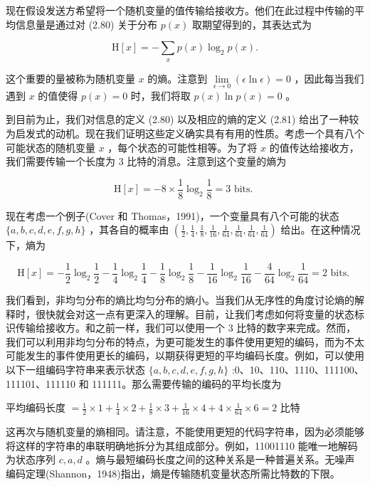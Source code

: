 \documentclass[10pt]{article}
\begin{document}
现在假设发送方希望将一个随机变量的值传输给接收方。他们在此过程中传输的平均信息量是通过对 (2.80) 关于分布 \(p\left( x\right)\) 取期望得到的，其表达式为

\[
\mathrm{H}\left\lbrack  x\right\rbrack   =  - \mathop{\sum }\limits_{x}p\left( x\right) {\log }_{2}p\left( x\right) . \tag{2.81}
\]

这个重要的量被称为随机变量 \(x\) 的熵。注意到 \(\mathop{\lim }\limits_{{\epsilon  \rightarrow  0}}\left( {\epsilon \ln \epsilon }\right)  = 0\) ，因此每当我们遇到 \(x\) 的值使得 \(p\left( x\right)  = 0\) 时，我们将取 \(p\left( x\right) \ln p\left( x\right)  = 0\) 。

到目前为止，我们对信息的定义 (2.80) 以及相应的熵的定义 (2.81) 给出了一种较为启发式的动机。现在我们证明这些定义确实具有有用的性质。考虑一个具有八个可能状态的随机变量 \(x\) ，每个状态的可能性相等。为了将 \(x\) 的值传达给接收方，我们需要传输一个长度为 3 比特的消息。注意到这个变量的熵为

\[
\mathrm{H}\left\lbrack  x\right\rbrack   =  - 8 \times  \frac{1}{8}{\log }_{2}\frac{1}{8} = 3\text{ bits. }
\]

现在考虑一个例子(Cover 和 Thomas，1991)，一个变量具有八个可能的状态 \(\{ a,b,c,d,e,f,g,h\}\) ，其各自的概率由 \(\left( {\frac{1}{2},\frac{1}{4},\frac{1}{8},\frac{1}{16},\frac{1}{64},\frac{1}{64},\frac{1}{64},\frac{1}{64}}\right)\) 给出。在这种情况下，熵为

\[
\mathrm{H}\left\lbrack  x\right\rbrack   =  - \frac{1}{2}{\log }_{2}\frac{1}{2} - \frac{1}{4}{\log }_{2}\frac{1}{4} - \frac{1}{8}{\log }_{2}\frac{1}{8} - \frac{1}{16}{\log }_{2}\frac{1}{16} - \frac{4}{64}{\log }_{2}\frac{1}{64} = 2\text{ bits. }
\]

我们看到，非均匀分布的熵比均匀分布的熵小。当我们从无序性的角度讨论熵的解释时，很快就会对这一点有更深入的理解。目前，让我们考虑如何将变量的状态标识传输给接收方。和之前一样，我们可以使用一个 3 比特的数字来完成。然而，我们可以利用非均匀分布的特点，为更可能发生的事件使用更短的编码，而为不太可能发生的事件使用更长的编码，以期获得更短的平均编码长度。例如，可以使用以下一组编码字符串来表示状态 \(\{ a,b,c,d,e,f,g,h\}\) :0、10、110、1110、111100、111101、111110 和 111111。那么需要传输的编码的平均长度为

平均编码长度 \(= \frac{1}{2} \times  1 + \frac{1}{4} \times  2 + \frac{1}{8} \times  3 + \frac{1}{16} \times  4 + 4 \times  \frac{1}{64} \times  6 = 2\) 比特

这再次与随机变量的熵相同。请注意，不能使用更短的代码字符串，因为必须能够将这样的字符串的串联明确地拆分为其组成部分。例如，11001110 能唯一地解码为状态序列 \(c,a,d\) 。熵与最短编码长度之间的这种关系是一种普遍关系。无噪声编码定理(Shannon，1948)指出，熵是传输随机变量状态所需比特数的下限。
\end{document}
